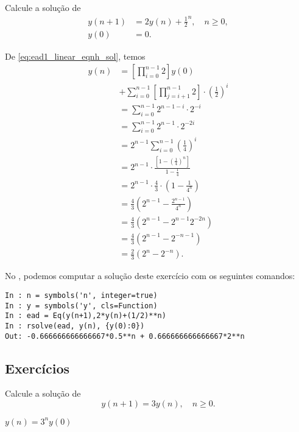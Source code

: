 \begin{exeresol}
  Calcule a solução de
  \begin{align}
    y(n+1) &= 2y(n) + \frac{1}{2}^n,\quad n\geq 0, \\
    y(0) &= 0.
  \end{align}
\end{exeresol}
\begin{resol}
  De \eqref{eq:ead1_linear_eqnh_sol}, temos
\begin{align}
  y(n) &= \left[\prod_{i=0}^{n-1} 2\right]y(0) \nonumber\\
       &+ \sum_{i=0}^{n-1}\left[\prod_{j=i+1}^{n-1} 2\right]\cdot\left(\frac{1}{2}\right)^i \\
       &= \sum_{i=0}^{n-1} 2^{n-1-i}\cdot 2^{-i} \\
       &= \sum_{i=0}^{n-1} 2^{n-1}\cdot 2^{-2i} \\
       &= 2^{n-1}\sum_{i=0}^{n-1}\left(\frac{1}{4}\right)^{i} \\
       &= 2^{n-1}\cdot \frac{\left[1-\left(\frac{1}{4}\right)^n\right]}{1-\frac{1}{4}} \\
       &=2^{n-1}\cdot\frac{4}{3}\cdot\left(1-\frac{1}{4^n}\right)\\
       &= \frac{4}{3}\left(2^{n-1} - \frac{2^{n-1}}{4^n}\right)\\
       &= \frac{4}{3}\left(2^{n-1} - 2^{n-1}2^{-2n}\right)\\
       &= \frac{4}{3}\left(2^{n-1}-2^{-n-1}\right)\\
       &= \frac{2}{3}\left(2^n-2^{-n}\right).
\end{align}

  \ifispython
  No \python, podemos computar a solução deste exercício com os seguintes comandos:
\begin{verbatim}
In : n = symbols('n', integer=true)
In : y = symbols('y', cls=Function)
In : ead = Eq(y(n+1),2*y(n)+(1/2)**n)
In : rsolve(ead, y(n), {y(0):0})
Out: -0.666666666666667*0.5**n + 0.666666666666667*2**n
\end{verbatim}
  \fi  
\end{resol}

\subsection*{Exercícios}

\begin{exer}
  Calcule a solução de
  \begin{equation}
    y(n+1) = 3y(n),\quad n\geq 0.
  \end{equation}
\end{exer}
\begin{resp}
  $y(n) = 3^ny(0)$
\end{resp}

